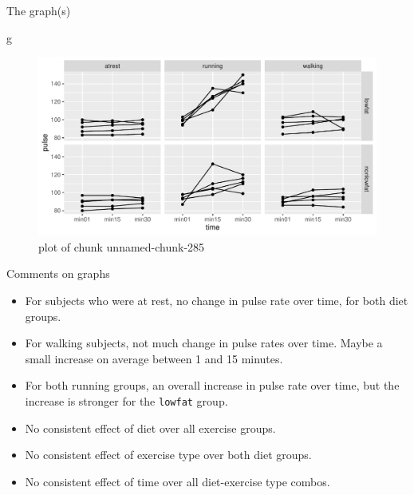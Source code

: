 \documentclass[ignorenonframetext,]{beamer}
\newenvironment{Shaded}{\begin{snugshade}}{\end{snugshade}}
\newcommand{\NormalTok}[1]{#1}
\begin{document}
\begin{frame}[fragile]{The graph(s)}
\protect\hypertarget{the-graphs}{}

\begin{Shaded}
\begin{Highlighting}[]
\NormalTok{g}
\end{Highlighting}
\end{Shaded}

\begin{figure}
\centering
\includegraphics{figure/unnamed-chunk-285-1.pdf}
\caption{plot of chunk unnamed-chunk-285}
\end{figure}

\end{frame}

\begin{frame}[fragile]{Comments on graphs}
\protect\hypertarget{comments-on-graphs}{}

\begin{itemize}
\item
  For subjects who were at rest, no change in pulse rate over time, for
  both diet groups.
\item
  For walking subjects, not much change in pulse rates over time. Maybe
  a small increase on average between 1 and 15 minutes.
\item
  For both running groups, an overall increase in pulse rate over time,
  but the increase is stronger for the \texttt{lowfat} group.
\item
  No consistent effect of diet over all exercise groups.
\item
  No consistent effect of exercise type over both diet groups.
\item
  No consistent effect of time over all diet-exercise type combos.
\end{itemize}

\end{frame}
\end{document}
